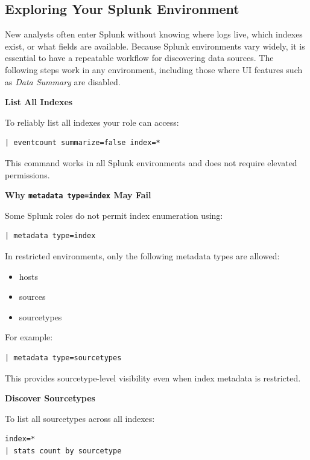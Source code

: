 \subsection*{Exploring Your Splunk Environment}

New analysts often enter Splunk without knowing where logs live, which indexes exist, or what fields are available. 
Because Splunk environments vary widely, it is essential to have a repeatable workflow for discovering data sources. 
The following steps work in any environment, including those where UI features such as \textit{Data Summary} are disabled.

\textbf{List All Indexes}

To reliably list all indexes your role can access:

\begin{lstlisting}
| eventcount summarize=false index=*
\end{lstlisting}

This command works in all Splunk environments and does not require elevated permissions.

\textbf{Why \texttt{metadata type=index} May Fail}

Some Splunk roles do not permit index enumeration using:

\begin{lstlisting}
| metadata type=index
\end{lstlisting}

In restricted environments, only the following metadata types are allowed:

\begin{itemize}
    \item hosts
    \item sources
    \item sourcetypes
\end{itemize}

For example:

\begin{lstlisting}
| metadata type=sourcetypes
\end{lstlisting}

This provides sourcetype-level visibility even when index metadata is restricted.

\textbf{Discover Sourcetypes}

To list all sourcetypes across all indexes:

\begin{lstlisting}
index=* 
| stats count by sourcetype
\end{lstlisting}

